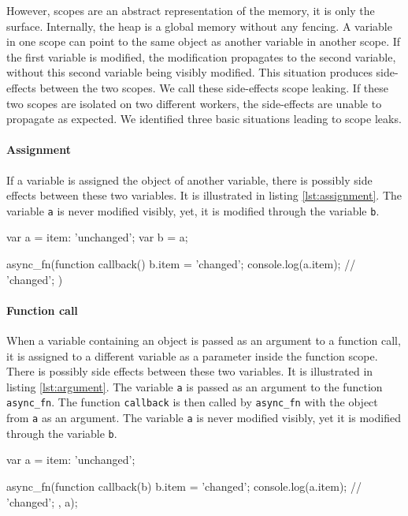 However, scopes are an abstract representation of the memory, it is only the surface.
Internally, the heap is a global memory without any fencing.
A variable in one scope can point to the same object as another variable in another scope.
If the first variable is modified, the modification propagates to the second variable, without this second variable being visibly modified.
This situation produces side-effects between the two scopes.
We call these side-effects scope leaking.
If these two scopes are isolated on two different workers, the side-effects are unable to propagate as expected.
We identified three basic situations leading to scope leaks.

\paragraph{Assignment}

If a variable is assigned the object of another variable, there is possibly side effects between these two variables.
It is illustrated in listing \ref{lst:assignment}.
The variable \texttt{a} is never modified visibly, yet, it is modified through the variable \texttt{b}.

\begin{code}[js, caption={Example of a scope leak due to assignment},label={lst:assignment}]
var a = {item: 'unchanged'};
var b = a;

async_fn(function callback() {
  b.item = 'changed';
  console.log(a.item); // 'changed';
})
\end{code}

\paragraph{Function call}

When a variable containing an object is passed as an argument to a function call, it is assigned to a different variable as a parameter inside the function scope.
There is possibly side effects between these two variables.
It is illustrated in listing \ref{lst:argument}.
The variable \texttt{a} is passed as an argument to the function \texttt{async\_fn}.
The function \texttt{callback} is then called by \texttt{async\_fn} with the object from \texttt{a} as an argument.
The variable \texttt{a} is never modified visibly, yet it is modified through the variable \texttt{b}.

\begin{code}[js, caption={Example of a scope leak due to a function call},label={lst:argument}]
var a = {item: 'unchanged'};

async_fn(function callback(b) {
  b.item = 'changed';
  console.log(a.item); // 'changed';
}, a);
\end{code}

